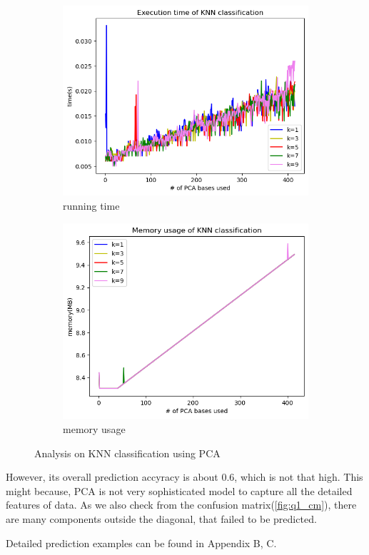 \begin{figure}
	\begin{subfigure}[t]{0.48\linewidth}
		\centering
		\includegraphics[width=\linewidth]{image/q1_time.png}
		\caption{running time}
		\label{fig:q1_knn_time}
	\end{subfigure}%
	\hfill
	\begin{subfigure}[t]{0.48\linewidth}
		\centering
		\includegraphics[width=\linewidth]{image/q1_memory.png}
		\caption{memory usage}
		\label{fig:q1_knn_memory}
	\end{subfigure}

	\caption{Analysis on KNN classification using PCA}
	\label{fig:pca_knn}
\end{figure}

However, its overall prediction accyracy is about 0.6, which is not that high. This might because, PCA is not very sophisticated model to capture all the detailed features of data. As we also check from the confusion matrix(\cref{fig:q1_cm}), there are many components outside the diagonal, that failed to be predicted.


Detailed prediction examples can be found in Appendix B, C.